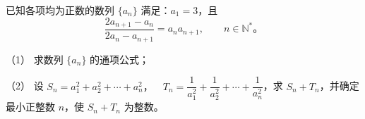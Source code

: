 \begin{question}
已知各项均为正数的数列 $\{a_n\}$ 满足：$a_1=3$，且
\nopagebreak[4]
\[
\frac{2a_{n+1}-a_n}{2a_n-a_{n+1}}=a_na_{n+1},\qquad n\in\mathbb N^*\mbox{。}
\]

（1） 求数列 $\{a_n\}$ 的通项公式；

（2） 设 $S_n=a_1^2+a_2^2+\cdots+a_n^2\text{，}\quad T_n=\dfrac1{a_1^2}+\dfrac1{a_2^2}+\cdots+\dfrac1{a_n^2}$，求 $S_n+T_n$，并确定最小正整数 $n$，使 $S_n+T_n$ 为整数。

\end{question}